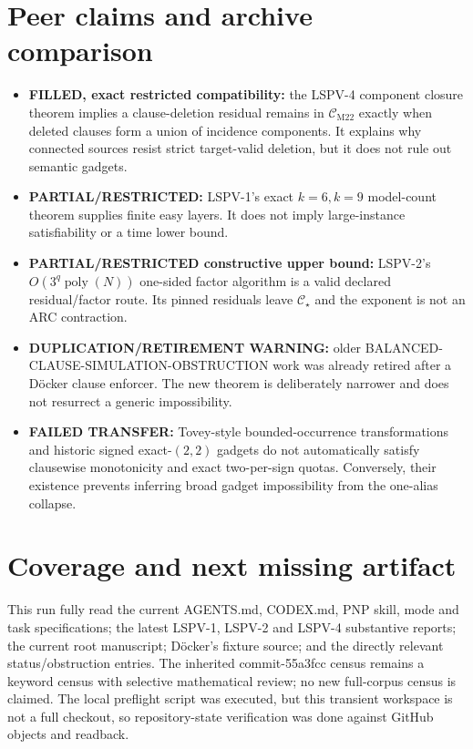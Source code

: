 \documentclass[11pt]{article}
\newcommand{\CM}{\mathcal C_{\mathrm{M22}}}
\newcommand{\Cs}{\mathcal C_\star}
\begin{document}
\section{Peer claims and archive comparison}
\begin{itemize}
\item \textbf{FILLED, exact restricted compatibility:} the LSPV-4 component
closure theorem implies a clause-deletion residual remains in $\CM$ exactly
when deleted clauses form a union of incidence components.  It explains why
connected sources resist strict target-valid deletion, but it does not rule
out semantic gadgets.
\item \textbf{PARTIAL/RESTRICTED:} LSPV-1's exact $k=6,k=9$ model-count
theorem supplies finite easy layers.  It does not imply large-instance
satisfiability or a time lower bound.
\item \textbf{PARTIAL/RESTRICTED constructive upper bound:} LSPV-2's
$O(3^q\operatorname{poly}(N))$ one-sided factor algorithm is a valid declared
residual/factor route.  Its pinned residuals leave $\Cs$ and the exponent is
not an ARC contraction.
\item \textbf{DUPLICATION/RETIREMENT WARNING:} older
BALANCED-CLAUSE-SIMULATION-OBSTRUCTION work was already retired after a
D\"ocker clause enforcer.  The new theorem is deliberately narrower and does
not resurrect a generic impossibility.
\item \textbf{FAILED TRANSFER:} Tovey-style bounded-occurrence transformations
and historic signed exact-$(2,2)$ gadgets do not automatically satisfy
clausewise monotonicity and exact two-per-sign quotas.  Conversely, their
existence prevents inferring broad gadget impossibility from the one-alias
collapse.
\end{itemize}

\section{Coverage and next missing artifact}
This run fully read the current AGENTS.md, CODEX.md, PNP skill, mode and task
specifications; the latest LSPV-1, LSPV-2 and LSPV-4 substantive reports; the
current root manuscript; D\"ocker's fixture source; and the directly relevant
status/obstruction entries.  The inherited commit-55a3fcc census remains a
keyword census with selective mathematical review; no new full-corpus census
is claimed.  The local preflight script was executed, but this transient
workspace is not a full checkout, so repository-state verification was done
against GitHub objects and readback.
\end{document}
